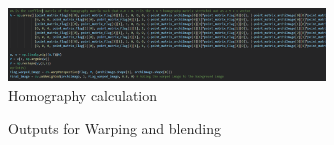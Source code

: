 \documentclass[11pt]{article}
\begin{document}
\begin{flushleft}
\begin{figure}[htp]
    \centering
    \includegraphics[width=0.75\textwidth]{Question2code3.png}
    \caption{Homography calculation}
\end{figure}

\begin{figure}
    \centering
    \qquad
    \qquad
    \caption{Outputs for Warping and blending}
    \label{fig:example2}
\end{figure}









\end{flushleft}
\end{document}
